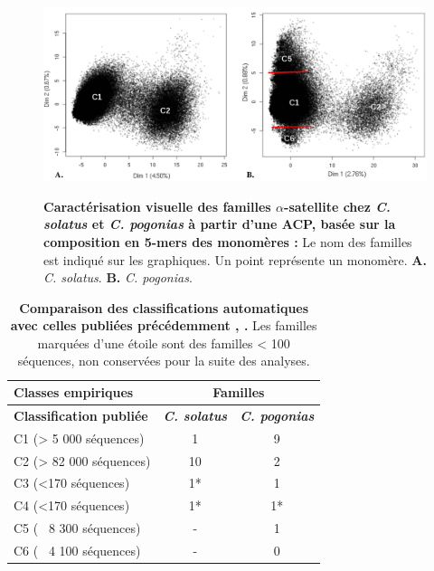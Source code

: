 \documentclass[12pt,a4paper]{article}
\begin{document}
		\begin{figure}	
			\includegraphics[scale=0.4]{img/ACP_experimental.png}  \\
			\caption{\textbf{Caractérisation visuelle des familles $\alpha$-satellite chez \textit{C. solatus} et \textit{C. pogonias} à partir d'une ACP, basée sur la composition en 5-mers des monomères :} Le nom des familles est indiqué sur les graphiques. Un point représente un monomère. \textbf{A.} \textit{C. solatus}. \textbf{B.} \textit{C. pogonias}.}
			\label{fig:ACP_exp} 
	\end{figure}
			

		\begin{table}
		\caption{\textbf{Comparaison des classifications automatiques avec celles publiées précédemment \cite{Cacheux2016}, \cite{Cacheux2018}.} Les familles marquées d'une étoile sont des familles < 100 séquences, non conservées pour la suite des analyses.}
			\center
			\begin{tabular}{|l|c|c|}
			\hline
			\textbf{Classes empiriques} & \multicolumn{2}{c|}{\textbf{Familles}} \\
	    	\hline
			\textbf{Classification publiée} &  \textbf{\textit{C. solatus}}  & \textbf{\textit{C. pogonias}}\\
			\hline
			C1 (> 5 000 séquences) &  1  & 9\\
			\hline
			C2 (> 82 000 séquences) & 10  & 2 \\
			\hline
			C3 (<170 séquences) & 1* & 1 \\
			\hline
			C4 (<170 séquences) & 1* & 1* \\
			\hline
			C5 (~ 8 300 séquences)& - 	 &  1 \\
			\hline
			C6 (~ 4 100 séquences) & -   &  0 \\
			\hline
			\end{tabular}
		\label{tab_count_fam}
	\end{table}
		
\end{document}
